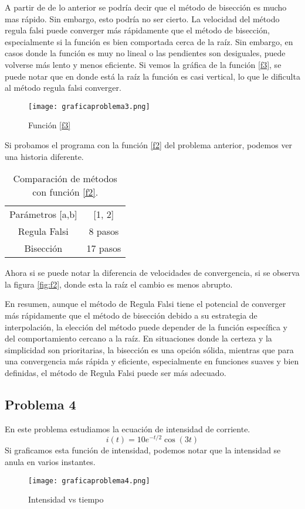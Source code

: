 \documentclass[12pt]{article}
\begin{document}
A partir de de lo anterior se podría decir que el método de bisección es mucho mas rápido. Sin embargo, esto podría no ser cierto. La velocidad del método regula falsi puede converger más rápidamente que el método de bisección, especialmente si la función es bien comportada cerca de la raíz. Sin embargo, en casos donde la función es muy no lineal o las pendientes son desiguales, puede volverse más lento y menos eficiente. Si vemos la gráfica de la función \ref{f3}, se puede notar que en donde está la raíz la función es casi vertical, lo que le dificulta al método regula falsi converger. 

\begin{figure}[h]
    \centering
    \texttt{[image: graficaproblema3.png]}
    \caption{Función \ref{f3}}
    \label{fig:f3}
\end{figure}

Si probamos el programa con la función \ref{f2} del problema anterior, podemos ver una historia diferente. 
\begin{table}[h!]
    \centering
    \begin{tabular}{cc}
        Parámetros [a,b] & [1, 2] \\
         Regula Falsi & 8 pasos \\
         Bisección& 17 pasos\\
    \end{tabular}
    \caption{Comparación de métodos con función \ref{f2}.}
    \label{tab:rp3.1}
\end{table}

Ahora si se puede notar la diferencia de velocidades de convergencia, si se observa la figura \ref{fig:f2}, donde esta la raíz el cambio es menos abrupto. 

En resumen, aunque el método de Regula Falsi tiene el potencial de converger más rápidamente que el método de bisección debido a su estrategia de interpolación, la elección del método puede depender de la función específica y del comportamiento cercano a la raíz. En situaciones donde la certeza y la simplicidad son prioritarias, la bisección es una opción sólida, mientras que para una convergencia más rápida y eficiente, especialmente en funciones suaves y bien definidas, el método de Regula Falsi puede ser más adecuado.

\subsection{Problema 4}
En este problema estudiamos la ecuación de intensidad de corriente. 
\begin{equation}
    \label{f4}
    i(t) = 10e^{-t/2}\cos(3t)
\end{equation}
Si graficamos esta función de intensidad, podemos notar que la intensidad se anula en varios instantes. 
\begin{figure}[h]
    \centering
    \texttt{[image: graficaproblema4.png]}
    \caption{Intensidad vs tiempo}
    \label{fig:f4}
\end{figure}
\newpage
\end{document}

